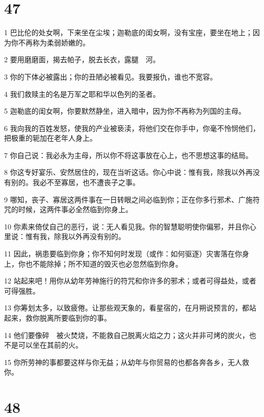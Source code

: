 \chapter{47}

\par 1 巴比伦的处女啊，下来坐在尘埃；迦勒底的闺女啊，没有宝座，要坐在地上；因为你不再称为柔弱娇嫩的。
\par 2 要用磨磨面，揭去帕子，脱去长衣，露腿　河。
\par 3 你的下体必被露出；你的丑陋必被看见。我要报仇，谁也不宽容。
\par 4 我们救赎主的名是万军之耶和华以色列的圣者。
\par 5 迦勒底的闺女啊，你要默然静坐，进入暗中，因为你不再称为列国的主母。
\par 6 我向我的百姓发怒，使我的产业被亵渎，将他们交在你手中，你毫不怜悯他们，把极重的轭加在老年人身上。
\par 7 你自己说：我必永为主母，所以你不将这事放在心上，也不思想这事的结局。
\par 8 你这专好宴乐、安然居住的，现在当听这话。你心中说：惟有我，除我以外再没有别的。我必不至寡居，也不遭丧子之事。
\par 9 哪知，丧子、寡居这两件事在一日转眼之间必临到你；正在你多行邪术、广施符咒的时候，这两件事必全然临到你身上。
\par 10 你素来倚仗自己的恶行，说：无人看见我。你的智慧聪明使你偏邪，并且你心里说：惟有我，除我以外再没有别的。
\par 11 因此，祸患要临到你身；你不知何时发现（或作：如何驱逐）灾害落在你身上，你也不能除掉；所不知道的毁灭也必忽然临到你身。
\par 12 站起来吧！用你从幼年劳神施行的符咒和你许多的邪术；或者可得益处，或者可得强胜。
\par 13 你筹划太多，以致疲倦。让那些观天象的，看星宿的，在月朔说预言的，都站起来，救你脱离所要临到你的事。
\par 14 他们要像碎　被火焚烧，不能救自己脱离火焰之力；这火并非可烤的炭火，也不是可以坐在其前的火。
\par 15 你所劳神的事都要这样与你无益；从幼年与你贸易的也都各奔各乡，无人救你。

\chapter{48}

